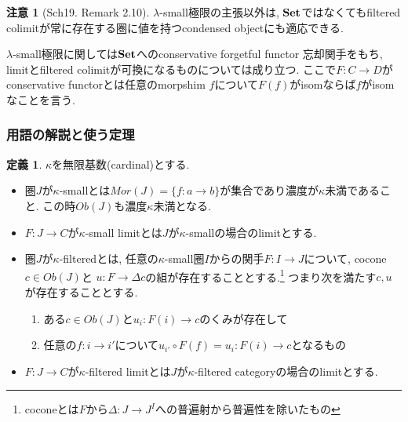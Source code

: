 \documentclass[dvipdfmx,a4paper,11pt]{article}
\theoremstyle{definition}
\newtheorem{dfn}[thm]{定義}
\newtheorem{rem}[thm]{注意}
\begin{document}
 
 \begin{rem}[Sch19. Remark 2.10]
 $\lambda$-small極限の主張以外は, ${\bf Set}$ではなくてもfiltered colimitが常に存在する圏に値を持つcondensed objectにも適応できる.
 
  $\lambda$-small極限に関しては${\bf Set}$へのconservative forgetful functor 忘却関手をもち, limitとfiltered colimitが可換になるものについては成り立つ. 
   ここで$F : C \to D$がconservative functorとは任意のmorpshim $f$について$F(f)$がisomならば$f$がisomなことを言う. 
 \end{rem}

\subsubsection{用語の解説と使う定理}

 \begin{tcolorbox}
 [colback = white, colframe = green!35!black, fonttitle = \bfseries,breakable = true]
 \begin{dfn}
 $\kappa$を無限基数(cardinal)とする.
 \begin{itemize}
 \item 圏$J$が$\kappa$-smallとは$Mor(J) =\{f : a \to b \}$が集合であり濃度が$\kappa$未満であること. この時$Ob(J)$も濃度$\kappa$未満となる.
 \item $F: J\to C$が$\kappa$-small limitとは$J$が$\kappa$-smallの場合のlimitとする.
 \item 圏$J$が$\kappa$-filteredとは, 
  任意の$\kappa$-small圏$I$からの関手$F : I \to J$について, cocone $c \in Ob(J)$と $u: F \to \Delta c$の組が存在することとする.\footnote{coconeとは$F$から$\Delta : J \to J^{I}$への普遍射から普遍性を除いたもの}
つまり次を満たす$c,u$が存在することとする. 
 \begin{enumerate}
 \item ある$c \in Ob(J)$と$u_{i} : F(i) \to c$のくみが存在して
 \item 任意の$f : i \to i'$について$ u_{i'}\circ F(f) = u_{i} : F(i) \to c$となるもの
 \end{enumerate}
\item $F: J\to C$が$\kappa$-filtered limitとは$J$が$\kappa$-filtered categoryの場合のlimitとする.
 \end{itemize}
 \end{dfn}
  \end{tcolorbox}
\end{document}
